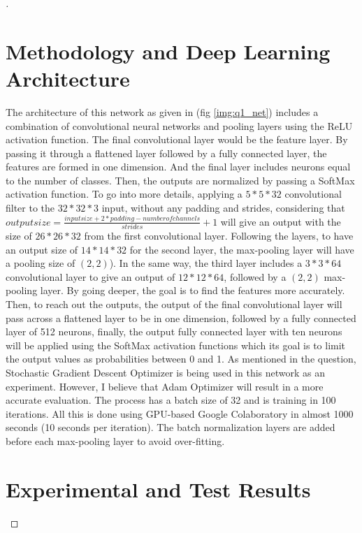 \documentclass[12pt,oneside,geqno]{article}
\begin{document}
\begin{proof}[\color{red}{Solution}]
		\section{Methodology and Deep Learning Architecture}
		The architecture of this network as given in (fig \ref{img:q1_net}) includes a combination of convolutional neural networks and pooling layers using the ReLU activation function. The final convolutional layer would be the feature layer. By passing it through a flattened layer followed by a fully connected layer, the features are formed in one dimension. And the final layer includes neurons equal to the number of classes. Then, the outputs are normalized by passing a SoftMax activation function. 
		To go into more details, applying a \(5*5*32\) convolutional filter to the \(32*32*3\) input, without any padding and strides, considering that \(output size = \frac{input size + 2 * padding - number of channels}{strides} + 1\) will give an output with the size of \(26*26*32\) from the first convolutional layer. Following the layers, to have an output size of \(14*14*32\) for the second layer, the max-pooling layer will have a pooling size of \((2, 2)\)). In the same way, the third layer includes a \(3*3*64\) convolutional layer to give an output of \(12*12*64\), followed by a \((2, 2)\) max-pooling layer. By going deeper, the goal is to find the features more accurately. Then, to reach out the outputs, the output of the final convolutional layer will pass across a flattened layer to be in one dimension, followed by a fully connected layer of 512 neurons, finally, the output fully connected layer with ten neurons will be applied using the SoftMax activation functions which its goal is to limit the output values as probabilities between 0 and 1. 
		As mentioned in the question, Stochastic Gradient Descent Optimizer is being used in this network as an experiment. However, I believe that Adam Optimizer will result in a more accurate evaluation. The process has a batch size of 32 and is training in 100 iterations. All this is done using GPU-based Google Colaboratory in almost 1000 seconds (10 seconds per iteration). The batch normalization layers are added before each max-pooling layer to avoid over-fitting. 
		
		\section{Experimental and Test Results}
		

\end{proof}
\end{document}
